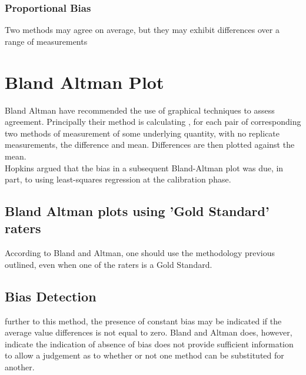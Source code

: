 \documentclass[12pt, a4paper]{report}
\begin{document}
\subsubsection*{Proportional Bias} Two methods may agree on
average, but they may exhibit differences over a range of
measurements\section{Bland Altman Plot} Bland Altman have
recommended the use of graphical techniques to assess agreement.
Principally their method is calculating , for each pair of
corresponding two methods of measurement of some underlying
quantity, with no replicate measurements, the difference and mean.
Differences are then plotted against the mean.
\\
Hopkins argued that the bias in a subsequent Bland-Altman plot was
due, in part, to using least-squares regression at the calibration
phase.

\subsection{Bland Altman plots using 'Gold Standard' raters}
According to Bland and Altman, one should use the methodology
previous outlined, even when one of the raters is a Gold Standard.


\subsection{Bias Detection}
further to this method, the presence of constant bias may be
indicated if the average value differences is not equal to zero.
Bland and Altman does, however, indicate the indication of absence
of bias does not provide sufficient information to allow a
judgement as to whether or not one method can be substituted for
another.












\end{document}
